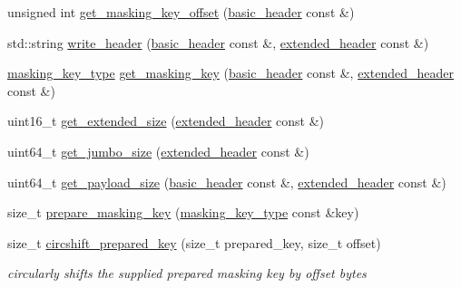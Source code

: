 \begin{DoxyCompactItemize}
unsigned int \hyperlink{namespacewebsocketpp_1_1frame_a574812ba4110e6d6f3206222507efb92}{get\+\_\+masking\+\_\+key\+\_\+offset} (\hyperlink{structwebsocketpp_1_1frame_1_1basic__header}{basic\+\_\+header} const \&)
\item 
std\+::string \hyperlink{namespacewebsocketpp_1_1frame_a510f505f5208e9f3a06e32e50b9b4e89}{write\+\_\+header} (\hyperlink{structwebsocketpp_1_1frame_1_1basic__header}{basic\+\_\+header} const \&, \hyperlink{structwebsocketpp_1_1frame_1_1extended__header}{extended\+\_\+header} const \&)
\item 
\hyperlink{namespacewebsocketpp_1_1frame_a8bdac8ec44c78c027fcf55aa3bad3f86}{masking\+\_\+key\+\_\+type} \hyperlink{namespacewebsocketpp_1_1frame_a24903598597ffd1068510908a47b5e59}{get\+\_\+masking\+\_\+key} (\hyperlink{structwebsocketpp_1_1frame_1_1basic__header}{basic\+\_\+header} const \&, \hyperlink{structwebsocketpp_1_1frame_1_1extended__header}{extended\+\_\+header} const \&)
\item 
uint16\+\_\+t \hyperlink{namespacewebsocketpp_1_1frame_a5f2ca23724e5ae99f8445a0b140d1c0a}{get\+\_\+extended\+\_\+size} (\hyperlink{structwebsocketpp_1_1frame_1_1extended__header}{extended\+\_\+header} const \&)
\item 
uint64\+\_\+t \hyperlink{namespacewebsocketpp_1_1frame_ad1ec01438c837f3411dfd2c42a805d73}{get\+\_\+jumbo\+\_\+size} (\hyperlink{structwebsocketpp_1_1frame_1_1extended__header}{extended\+\_\+header} const \&)
\item 
uint64\+\_\+t \hyperlink{namespacewebsocketpp_1_1frame_a8af14e44955e4f05a83f1f2b1b191734}{get\+\_\+payload\+\_\+size} (\hyperlink{structwebsocketpp_1_1frame_1_1basic__header}{basic\+\_\+header} const \&, \hyperlink{structwebsocketpp_1_1frame_1_1extended__header}{extended\+\_\+header} const \&)
\item 
size\+\_\+t \hyperlink{namespacewebsocketpp_1_1frame_a34fb805fa5dc58265101904b3077aada}{prepare\+\_\+masking\+\_\+key} (\hyperlink{namespacewebsocketpp_1_1frame_a8bdac8ec44c78c027fcf55aa3bad3f86}{masking\+\_\+key\+\_\+type} const \&key)
\item 
size\+\_\+t \hyperlink{namespacewebsocketpp_1_1frame_a76bf120d54d47d760eb8bd803572b004}{circshift\+\_\+prepared\+\_\+key} (size\+\_\+t prepared\+\_\+key, size\+\_\+t offset)
\begin{DoxyCompactList}\small\item\em circularly shifts the supplied prepared masking key by offset bytes \end{DoxyCompactList}\item 

\end{DoxyCompactItemize}
